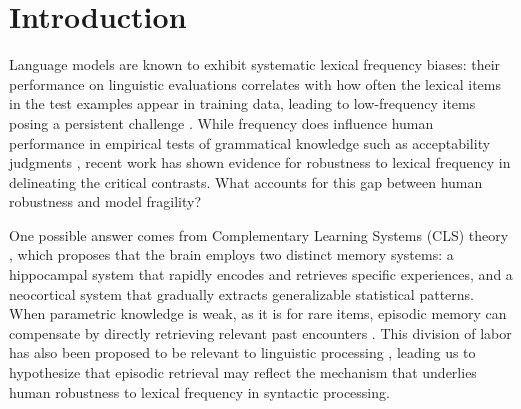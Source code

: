 \graphicspath{{ch3/papers/RAG/}}
\providecommand{\fix}{\marginpar{FIX}}
\providecommand{\new}{\marginpar{NEW}}



\section{Introduction}

Language models are known to exhibit systematic lexical frequency biases: their performance on linguistic evaluations correlates with how often the lexical items in the test examples appear in training data, leading to low-frequency items posing a persistent challenge \citep{wei-etal-2021-frequency,kim2022uncontrolled,diehl-martinez-etal-2024-mitigating}. While frequency does influence human performance in empirical tests of grammatical knowledge such as acceptability judgments \citep[i.a.]{kempen2005relationship,bader2010toward,lau2017grammaticality}, recent work \citep{christensen2024complexity} has shown evidence for robustness to lexical frequency in delineating the critical contrasts. What accounts for this gap between human robustness and model fragility?


One possible answer comes from Complementary Learning Systems (CLS) theory 
\citep{mcclelland1995there,kumaran2016learning}, which proposes that the brain employs two distinct memory systems: a hippocampal system that rapidly encodes and retrieves specific experiences, and a neocortical system that gradually extracts generalizable statistical patterns. When parametric knowledge is weak, as it is for rare items, episodic memory can compensate by directly retrieving relevant past encounters \citep{davis2009complementary}. This division of labor has also been proposed to be relevant to linguistic processing \citep{borensztajn2011episodic,duff2012hippocampus}, leading us to hypothesize that episodic retrieval may reflect the mechanism that underlies human robustness to lexical frequency in syntactic processing.

 


